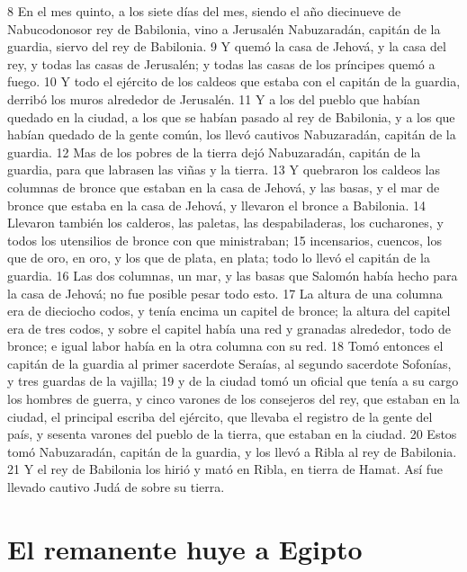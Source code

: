  
8 En el mes quinto, a los siete días del mes, siendo el año diecinueve de Nabucodonosor rey de Babilonia, vino a Jerusalén Nabuzaradán, capitán de la guardia, siervo del rey de Babilonia.
9 Y quemó la casa de Jehová, y la casa del rey, y todas las casas de Jerusalén; y todas las casas de los príncipes quemó a fuego.
10 Y todo el ejército de los caldeos que estaba con el capitán de la guardia, derribó los muros alrededor de Jerusalén.
11 Y a los del pueblo que habían quedado en la ciudad, a los que se habían pasado al rey de Babilonia, y a los que habían quedado de la gente común, los llevó cautivos Nabuzaradán, capitán de la guardia.
12 Mas de los pobres de la tierra dejó Nabuzaradán, capitán de la guardia, para que labrasen las viñas y la tierra.
13 Y quebraron los caldeos las columnas de bronce que estaban en la casa de Jehová, y las basas, y el mar de bronce que estaba en la casa de Jehová, y llevaron el bronce a Babilonia.
14 Llevaron también los calderos, las paletas, las despabiladeras, los cucharones, y todos los utensilios de bronce con que ministraban; 
15 incensarios, cuencos, los que de oro, en oro, y los que de plata, en plata; todo lo llevó el capitán de la guardia.
16 Las dos columnas, un mar, y las basas que Salomón había hecho para la casa de Jehová; no fue posible pesar todo esto.
17 La altura de una columna era de dieciocho codos,  y tenía encima un capitel de bronce; la altura del capitel era de tres codos, y sobre el capitel había una red y granadas alrededor, todo de bronce; e igual labor había en la otra columna con su red.
18 Tomó entonces el capitán de la guardia al primer sacerdote Seraías, al segundo sacerdote Sofonías, y tres guardas de la vajilla;
19 y de la ciudad tomó un oficial que tenía a su cargo los hombres de guerra, y cinco varones de los consejeros del rey, que estaban en la ciudad, el principal escriba del ejército, que llevaba el registro de la gente del país, y sesenta varones del pueblo de la tierra, que estaban en la ciudad.
20 Estos tomó Nabuzaradán, capitán de la guardia, y los llevó a Ribla al rey de Babilonia.
21 Y el rey de Babilonia los hirió y mató en Ribla, en tierra de Hamat. Así fue llevado cautivo Judá de sobre su tierra.
\section*{El remanente huye a Egipto}

